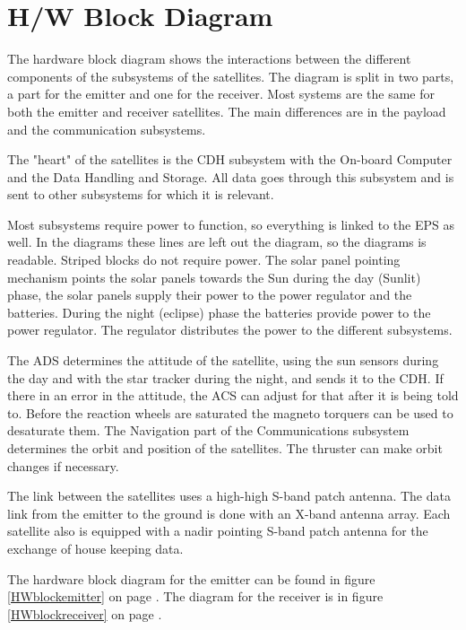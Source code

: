 \section{H/W Block Diagram}
The hardware block diagram shows the interactions between the different components of the subsystems of the satellites. The diagram is split in two parts, a part for the emitter and one for the receiver. Most systems are the same for both the emitter and receiver satellites. The main differences are in the payload and the communication subsystems.

The "heart" of the satellites is the \ac{CDH} subsystem with the On-board Computer and the Data Handling and Storage. All data goes through this subsystem and is sent to other subsystems for which it is relevant. 

Most subsystems require power to function, so everything is linked to the \ac{EPS} as well. In the diagrams these lines are left out the diagram, so the diagrams is readable. Striped blocks do not require power. The solar panel pointing mechanism points the solar panels towards the Sun during the day (Sunlit) phase, the solar panels supply their power to the power regulator and the batteries. During the night (eclipse) phase the batteries provide power to the power regulator. The regulator distributes the power to the different subsystems.

The \ac{ADS} determines the attitude of the satellite, using the sun sensors during the day and with the star tracker during the night, and sends it to the \ac{CDH}. If there in an error in the attitude, the \ac{ACS} can adjust for that after it is being told to. Before the reaction wheels are saturated the magneto torquers can be used to desaturate them. The Navigation part of the Communications subsystem determines the orbit and position of the satellites. The thruster can make orbit changes if necessary.

The link between the satellites uses a high-high S-band patch antenna. The data link from the emitter to the ground is done with an X-band antenna array. Each satellite also is equipped with a nadir pointing S-band patch antenna for the exchange of house keeping data.

The hardware block diagram for the emitter can be found in figure \ref{HWblockemitter} on page \pageref{HWblockemitter}. The diagram for the receiver is in figure \ref{HWblockreceiver} on page \pageref{HWblockreceiver}.


